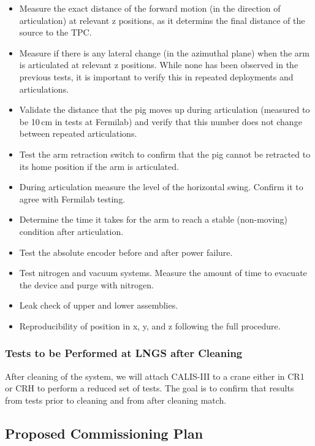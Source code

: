 \begin{itemize}
\item 
Measure the exact distance of the forward motion (in the direction of articulation) at relevant z positions, as it determins the final distance of the source to the TPC.

\item
Measure if there is any lateral change (in the azimuthal plane) when the arm is articulated at relevant z positions. While none has been observed in the previous tests, it is important to verify this in repeated deployments and articulations.

\item 
Validate the distance that the pig moves up during articulation (measured to be 10\,cm in tests at Fermilab) and verify that this number does not change between repeated articulations.

  \item
Test the arm retraction switch to confirm that the pig cannot be retracted to its home position if the arm is articulated.
  
  \item
During articulation measure the level of the horizontal swing. Confirm it to agree with Fermilab testing.
 
  \item{Determine the time it takes for the arm to reach a stable (non-moving) condition after articulation.}
 
  \item{Test the absolute encoder before and after power failure.}
  \item{Test nitrogen and vacuum systems. Measure the amount of time to evacuate the device and purge with nitrogen.}
  \item{Leak check of upper and lower assemblies.}
  \item{Reproducibility of position in x, y, and z following the full procedure.}
 \end{itemize}
 
\subsubsection{Tests to be Performed at LNGS after Cleaning}
 After cleaning of the system, we will attach CALIS-III to a crane either in CR1 or CRH to perform a reduced set of tests.  The goal is to confirm that results from tests prior to cleaning and from after cleaning match. 
  
 
  
\subsection{Proposed Commissioning Plan} \label{Proposed Commissioning Plan}
